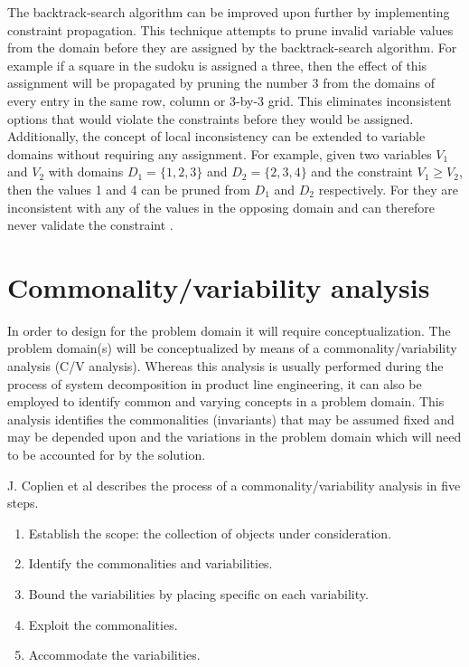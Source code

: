 The backtrack-search algorithm can be improved upon further by implementing constraint propagation. This technique attempts to prune invalid variable values from the domain before they are assigned by the backtrack-search algorithm. For example if a square in the sudoku is assigned a three, then the effect of this assignment will be propagated by pruning the number 3 from the domains of every entry in the same row, column or 3-by-3 grid. This eliminates inconsistent options that would violate the constraints before they would be assigned. Additionally, the concept of local inconsistency can be extended to variable domains without requiring any assignment. For example, given two variables $V_1$ and $V_2$ with domains $D_1=\{1,2,3\}$ and $D_2=\{2,3,4\}$ and the constraint $V_1 \geq V_2$, then the values 1 and 4 can be pruned from $D_1$ and $D_2$ respectively. For they are inconsistent with any of the values in the opposing domain and can therefore never validate the constraint \cite{constraint_general, constraint_algorithm}.
\section{Commonality/variability analysis}
\label{sec:back:cv_analysis}
In order to design for the problem domain it will require conceptualization. The problem domain(s) will be conceptualized by means of a commonality/variability analysis (C/V analysis). Whereas this analysis is usually performed during the process of system decomposition in product line engineering, it can also be employed to identify common and varying concepts in a problem domain. This analysis identifies the commonalities (invariants) that may be assumed fixed and may be depended upon and the variations in the problem domain which will need to be accounted for by the solution.

J. Coplien et al \cite{cv_analysis} describes the process of a commonality/variability analysis in five steps.
\begin{enumerate}
\nospace
\item Establish the scope: the collection of objects under consideration.
\item Identify the commonalities and variabilities.
\item Bound the variabilities by placing specific on each variability.
\item Exploit the commonalities.
\item Accommodate the variabilities.
\end{enumerate}

